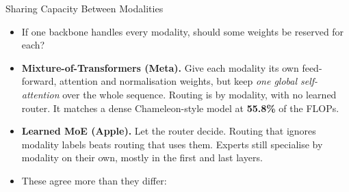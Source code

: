 \begin{frame}{Sharing Capacity Between Modalities}
    \begin{itemize}\itemsep0.36em
        \item If one backbone handles every modality, should some weights be reserved for each?
        \item \textbf{Mixture-of-Transformers (Meta).} Give each modality its own feed-forward, attention and normalisation weights, but keep \emph{one global self-attention} over the whole sequence. Routing is by modality, with no learned router. It matches a dense Chameleon-style model at \textbf{55.8\%} of the FLOPs.
        \item \textbf{Learned MoE (Apple).} Let the router decide. Routing that ignores modality labels beats routing that uses them. Experts still specialise by modality on their own, mostly in the first and last layers.
        \item These agree more than they differ:
    \end{itemize}
    \vspace{0.07em}
\end{frame}

